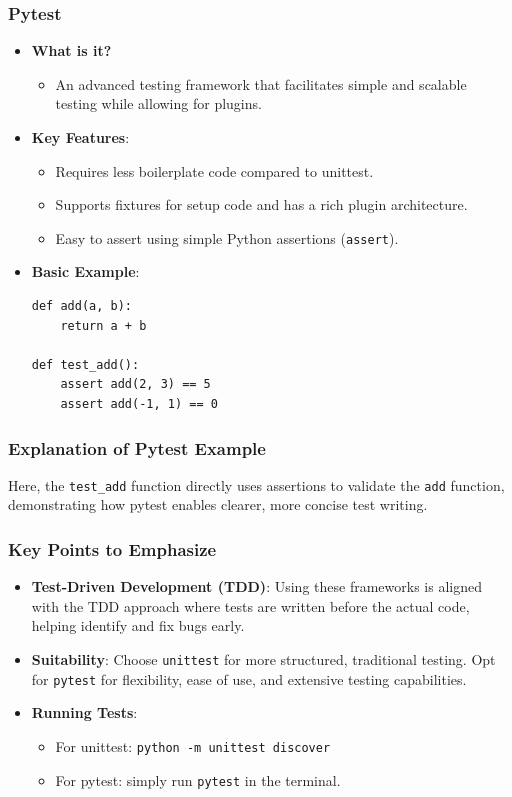 \documentclass{beamer}
\begin{document}
\begin{frame}[fragile]
    \frametitle{Pytest}
    \begin{itemize}
        \item \textbf{What is it?}
        \begin{itemize}
            \item An advanced testing framework that facilitates simple and scalable testing while allowing for plugins.
        \end{itemize}

        \item \textbf{Key Features}:
        \begin{itemize}
            \item Requires less boilerplate code compared to unittest.
            \item Supports fixtures for setup code and has a rich plugin architecture.
            \item Easy to assert using simple Python assertions (\texttt{assert}).
        \end{itemize}

        \item \textbf{Basic Example}:
        \begin{lstlisting}
def add(a, b):
    return a + b

def test_add():
    assert add(2, 3) == 5
    assert add(-1, 1) == 0
        \end{lstlisting}
    \end{itemize}
\end{frame}

\begin{frame}
    \frametitle{Explanation of Pytest Example}
    Here, the \texttt{test_add} function directly uses assertions to validate the \texttt{add} function, demonstrating how pytest enables clearer, more concise test writing.
\end{frame}

\begin{frame}
    \frametitle{Key Points to Emphasize}
    \begin{itemize}
        \item \textbf{Test-Driven Development (TDD)}: Using these frameworks is aligned with the TDD approach where tests are written before the actual code, helping identify and fix bugs early.
        \item \textbf{Suitability}: Choose \texttt{unittest} for more structured, traditional testing. Opt for \texttt{pytest} for flexibility, ease of use, and extensive testing capabilities.
        \item \textbf{Running Tests}: 
        \begin{itemize}
            \item For unittest: \texttt{python -m unittest discover}
            \item For pytest: simply run \texttt{pytest} in the terminal.
        \end{itemize}
    \end{itemize}
\end{frame}
\end{document}
